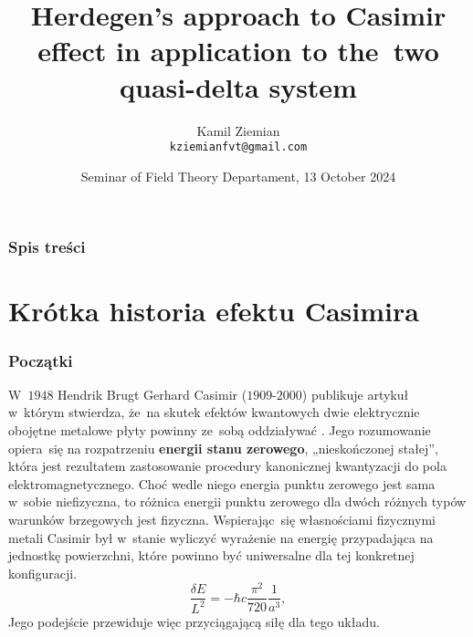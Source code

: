 \documentclass[10pt,t]{beamer}
\title{Herdegen's approach to Casimir effect in application to
  the~two quasi-delta system}
\author{Kamil Ziemian \\
  \texttt{kziemianfvt@gmail.com}}
\date[13 X 2024]{Seminar of Field Theory Departament,
  13 October 2024}
\begin{document}





\RaggedRight





\maketitle





\begin{frame}
  \frametitle{Spis treści}


  \tableofcontents %

\end{frame}










\section{Krótka historia efektu Casimira}



\begin{frame}
  \frametitle{Początki}


  W~$1948$ Hendrik Brugt Gerhard Casimir ($1909\text{-}2000$)
  publikuje artykuł w~którym stwierdza, że~na skutek efektów kwantowych
  dwie elektrycznie obojętne metalowe płyty powinny ze~sobą oddziaływać
  \parencite{Casimir-On-the-Attraction-Between-ETC-Pub-1948}. Jego
  rozumowanie opiera~się na rozpatrzeniu \textbf{energii stanu zerowego},
  „nieskończonej stałej”, która jest rezultatem zastosowanie procedury
  kanonicznej kwantyzacji do pola elektromagnetycznego. Choć wedle niego
  energia punktu zerowego jest sama w~sobie niefizyczna, to różnica
  energii punktu zerowego dla dwóch różnych typów warunków brzegowych
  jest fizyczna. Wspierając~się własnościami fizycznymi metali
  Casimir był w~stanie wyliczyć wyrażenie na energię przypadająca na
  jednostkę powierzchni, które powinno być uniwersalne dla tej konkretnej
  konfiguracji.
  \begin{equation}
    \label{eq:Krotka-historia-ETC-01}
    \frac{ \delta E }{ L^{ 2 } } =
    -\hbar c \frac{ \pi^{ 2 } }{ 720 } \frac{ 1 }{ a^{ 3 } },
  \end{equation}
  Jego podejście przewiduje więc przyciągającą siłę dla tego układu.

\end{frame}
\end{document}
